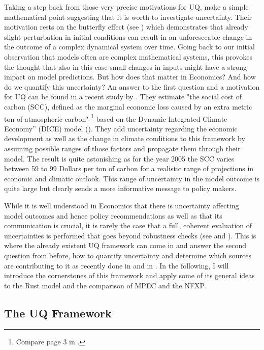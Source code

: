 Taking a step back from those very precise motivations for UQ, \cite{Smith.2019} make a simple mathematical point suggesting that it is worth to investigate uncertainty. Their motivation rests on the butterfly effect (see \cite{Lorenz.1963}) which demonstrates that already slight perturbation in initial conditions can result in an unforeseeable change in the outcome of a complex dynamical system over time. Going back to our initial observation that models often are complex mathematical systems, this provokes the thought that also in this case small changes in inputs might have a strong impact on model predictions. But how does that matter in Economics? And how do we quantify this uncertainty? An answer to the first question and a motivation for UQ can be found in a recent study by \cite{Cai.2019}. They estimate "the social cost of carbon (SCC), defined as the marginal economic loss caused by an extra metric ton of atmospheric carbon" \footnote{Compare page 3 in \cite{Cai.2019}.} based on the Dynamic Integrated Climate–Economy” (DICE) model (\cite{Nordhaus.1992, Nordhaus.2008}). They add uncertainty regarding the economic development as well as the change in climate conditions to this framework by assuming possible ranges of those factors and propagate them through their model. The result is quite astonishing as for the year 2005 the SCC varies between 59 to 99 Dollars per ton of carbon for a realistic range of projections in economic and climatic outlook. This range of uncertainty in the model outcome is quite large but clearly sends a more informative message to policy makers.

While it is well understood in Economics that there is uncertainty affecting model outcomes and hence policy recommendations as well as that its communication is crucial, it is rarely the case that a full, coherent evaluation of uncertainties is performed that goes beyond robustness checks (see \cite{Manski.2019} and \cite{Scheidegger.2019}). This is where the already existent UQ framework can come in and answer the second question from before, how to quantify uncertainty and determine which sources are contributing to it as recently done in \cite{Scheidegger.2019} and in \cite{Harenberg.2019}. In the following, I will introduce the cornerstones of this framework and apply some of its general ideas to the Rust model and the comparison of MPEC and the NFXP.

\subsection{The UQ Framework}

